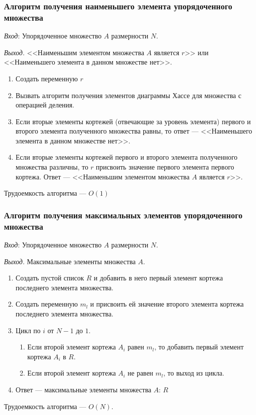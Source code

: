 \documentclass[bachelor, och, labwork]{shiza}
\begin{document}
\subsubsection{Алгоритм получения наименьшего элемента упорядоченного множества}
\textit{Вход}: Упорядоченное множество $A$ размерности $N$.

\textit{Выход.} <<Наименьшим элементом множества $A$ является $r$>> 
или <<Наименьшего элемента в данном множестве нет>>.
\begin{enumerate}
    \item Создать переменную $r$
    \item Вызвать алгоритм получения элементов диаграммы Хассе для множества с операцией деления.
    \item Если вторые элементы кортежей (отвечающие за уровень элемента) первого
    и второго элемента полученного множества равны, то ответ --- <<Наименьшего элемента в данном множестве нет>>.
    \item Если вторые элементы кортежей первого и второго элемента полученного 
    множества различны, то $r$ присвоить значение первого элемента первого кортежа.
    Ответ --- <<Наименьшим элементом множества $A$ является $r$>>.
\end{enumerate}
Трудоемкость алгоритма --- $O(1)$

\subsubsection{Алгоритм получения максимальных элементов упорядоченного множества}
\textit{Вход}: Упорядоченное множество $A$ размерности $N$.

\textit{Выход.} Максимальные элементы множества $A$.
\begin{enumerate}
    \item Создать пустой список $R$ и добавить в него первый элемент кортежа
    последнего элемента множества.
    \item Создать переменную $m_l$ и присвоить ей значение второго элемента кортежа
    последнего элемента множества.
    \item Цикл по $i$ от $N-1$ до $1$.
        \begin{enumerate}
            \item Если второй элемент кортежа $A_i$ равен $m_l$, то добавить
            первый элемент кортежа $A_i$ в $R$.
            \item Если второй элемент кортежа $A_i$ не равен $m_l$, то выход из цикла.
        \end{enumerate}
    \item Ответ --- максимальные элементы множества $A$: $R$
\end{enumerate}
Трудоемкость алгоритма --- $O(N)$.
\end{document}
